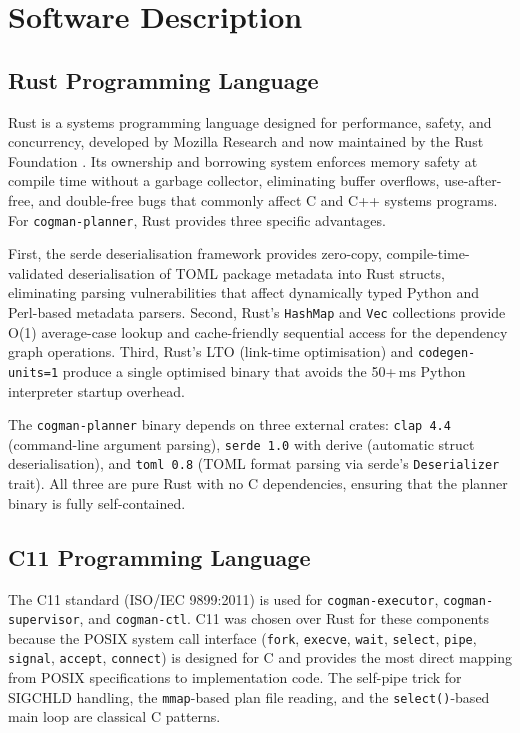 \documentclass[12pt,a4paper]{report}
\begin{document}
\chapter{Software Description}

\section{Rust Programming Language}

Rust is a systems programming language designed for performance, safety, and
concurrency, developed by Mozilla Research and now maintained by the Rust
Foundation \cite{rust}. Its ownership and borrowing system enforces memory safety
at compile time without a garbage collector, eliminating buffer overflows,
use-after-free, and double-free bugs that commonly affect C and C++ systems
programs. For \texttt{cogman-planner}, Rust provides three specific advantages.

First, the serde deserialisation framework provides zero-copy, compile-time-validated
deserialisation of TOML package metadata into Rust structs, eliminating parsing
vulnerabilities that affect dynamically typed Python and Perl-based metadata
parsers. Second, Rust's \texttt{HashMap} and \texttt{Vec} collections provide
O(1) average-case lookup and cache-friendly sequential access for the dependency
graph operations. Third, Rust's LTO (link-time optimisation) and
\texttt{codegen-units=1} produce a single optimised binary that avoids the 50+\,ms
Python interpreter startup overhead.

The \texttt{cogman-planner} binary depends on three external crates: \texttt{clap
4.4} (command-line argument parsing), \texttt{serde 1.0} with derive (automatic
struct deserialisation), and \texttt{toml 0.8} (TOML format parsing via serde's
\texttt{Deserializer} trait). All three are pure Rust with no C dependencies,
ensuring that the planner binary is fully self-contained.

\section{C11 Programming Language}

The C11 standard (ISO/IEC 9899:2011) \cite{c11} is used for
\texttt{cogman-executor}, \texttt{cogman-supervisor}, and \texttt{cogman-ctl}. C11
was chosen over Rust for these components because the POSIX system call interface
(\texttt{fork}, \texttt{execve}, \texttt{wait}, \texttt{select}, \texttt{pipe},
\texttt{signal}, \texttt{accept}, \texttt{connect}) is designed for C and provides
the most direct mapping from POSIX specifications to implementation code. The
self-pipe trick for SIGCHLD handling, the \texttt{mmap}-based plan file reading,
and the \texttt{select()}-based main loop are classical C patterns.
\end{document}
